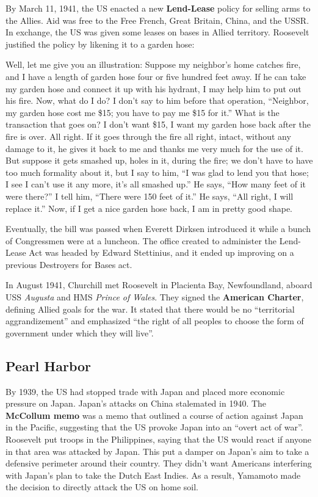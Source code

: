 By March 11, 1941, the US enacted a new \textbf{Lend-Lease} policy for selling arms to the Allies.
Aid was free to the Free French, Great Britain, China, and the USSR\@.
In exchange, the US was given some leases on bases in Allied territory.
Roosevelt justified the policy by likening it to a garden hose:
\begin{quoting}
  Well, let me give you an illustration:
  Suppose my neighbor's home catches fire,
  and I have a length of garden hose four or five hundred feet away.
  If he can take my garden hose and connect it up with his hydrant,
  I may help him to put out his fire.
  Now, what do I do?
  I don't say to him before that operation,
  ``Neighbor, my garden hose cost me \$15; you have to pay me \$15 for it.''
  What is the transaction that goes on?
  I don't want \$15, I want my garden hose back after the fire is over.
  All right.
  If it goes through the fire all right, intact, without any damage to it,
  he gives it back to me and thanks me very much for the use of it.
  But suppose it gets smashed up, holes in it, during the fire;
  we don't have to have too much formality about it,
  but I say to him,
  ``I was glad to lend you that hose; I see I can't use it any more, it's all smashed up.''
  He says, ``How many feet of it were there?''
  I tell him, ``There were 150 feet of it.''
  He says, ``All right, I will replace it.''
  Now, if I get a nice garden hose back, I am in pretty good shape.
\end{quoting}
Eventually,
the bill was passed when Everett Dirksen introduced it
while a bunch of Congressmen were at a luncheon.
The office created to administer the Lend-Lease Act was headed by Edward Stettinius,
and it ended up improving on a previous Destroyers for Bases act.

In August 1941, Churchill met Roosevelt in Placienta Bay, Newfoundland,
aboard USS \textit{Augusta} and HMS \textit{Prince of Wales}.
They signed the \textbf{American Charter}, defining Allied goals for the war.
It stated that there would be no ``territorial aggrandizement''
and emphasized
``the right of all peoples to choose the form of government under which they will live''.

\subsection*{Pearl Harbor}

By 1939, the US had stopped trade with Japan and placed more economic pressure on Japan.
Japan's attacks on China stalemated in 1940.
The \textbf{McCollum memo} was a memo that outlined a course of action against Japan in the Pacific,
suggesting that the US provoke Japan into an ``overt act of war''.
Roosevelt put troops in the Philippines,
saying that the US would react if anyone in that area was attacked by Japan.
This put a damper on Japan's aim to take a defensive perimeter around their country.
They didn't want Americans interfering with Japan's plan to take the Dutch East Indies.
As a result, Yamamoto made the decision to directly attack the US on home soil.

